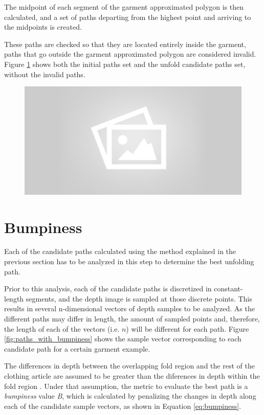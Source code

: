 The midpoint of each segment of the garment approximated polygon is then calculated, and a set of paths departing from the highest point and arriving to the midpoints is created.

These paths are checked so that they are located entirely inside the garment, paths that go outside the garment approximated polygon are considered invalid. Figure \ref{fig:candidate_paths} shows both the initial paths set and the unfold candidate paths set, without the invalid paths.

\begin{figure}[thpb]
    \centering
    \includegraphics[width=0.7
    \textwidth]{figures/placeholder2.png}
    \caption{}
    \label{fig:candidate_paths}
\end{figure}

\section{Bumpiness}
\label{bumpiness}
Each of the candidate paths calculated using the method explained in the previous section has to be analyzed in this step to determine the best unfolding path. 

Prior to this analysis, each of the candidate paths is discretized in constant-length segments, and the depth image is sampled at those discrete points. This results in several n-dimensional vectors of depth samples to be analyzed. As the different paths may differ in length, the amount of sampled points and, therefore, the length of each of the vectors (i.e. $n$) will be different for each path. Figure \ref{fig:paths_with_bumpiness} shows the sample vector corresponding to each candidate path for a certain garment example.

The differences in depth between the overlapping fold region and the rest of the clothing article are assumed to be greater than the diferences in depth within the fold region . Under that assumption, the metric to evaluate the best path is a \textit{bumpiness} value \textit{B}, which is calculated by penalizing the changes in depth along each of the candidate sample vectors, as shown in Equation \ref{eq:bumpiness}.


